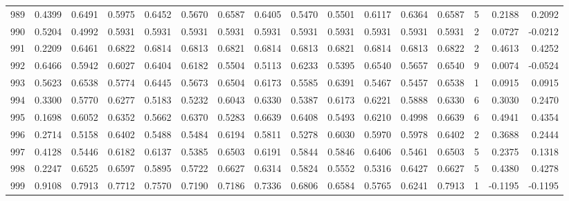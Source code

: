 \begin{tabular}{lrrrrrrrrrrrrrrr}
989 &      0.4399 &  0.6491 &  0.5975 &  0.6452 &  0.5670 &  0.6587 &  0.6405 &  0.5470 &  0.5501 &  0.6117 &   0.6364 &     0.6587 &      5 &                    0.2188 &                     0.2092 \\
990 &      0.5204 &  0.4992 &  0.5931 &  0.5931 &  0.5931 &  0.5931 &  0.5931 &  0.5931 &  0.5931 &  0.5931 &   0.5931 &     0.5931 &      2 &                    0.0727 &                    -0.0212 \\
991 &      0.2209 &  0.6461 &  0.6822 &  0.6814 &  0.6813 &  0.6821 &  0.6814 &  0.6813 &  0.6821 &  0.6814 &   0.6813 &     0.6822 &      2 &                    0.4613 &                     0.4252 \\
992 &      0.6466 &  0.5942 &  0.6027 &  0.6404 &  0.6182 &  0.5504 &  0.5113 &  0.6233 &  0.5395 &  0.6540 &   0.5657 &     0.6540 &      9 &                    0.0074 &                    -0.0524 \\
993 &      0.5623 &  0.6538 &  0.5774 &  0.6445 &  0.5673 &  0.6504 &  0.6173 &  0.5585 &  0.6391 &  0.5467 &   0.5457 &     0.6538 &      1 &                    0.0915 &                     0.0915 \\
994 &      0.3300 &  0.5770 &  0.6277 &  0.5183 &  0.5232 &  0.6043 &  0.6330 &  0.5387 &  0.6173 &  0.6221 &   0.5888 &     0.6330 &      6 &                    0.3030 &                     0.2470 \\
995 &      0.1698 &  0.6052 &  0.6352 &  0.5662 &  0.6370 &  0.5283 &  0.6639 &  0.6408 &  0.5493 &  0.6210 &   0.4998 &     0.6639 &      6 &                    0.4941 &                     0.4354 \\
996 &      0.2714 &  0.5158 &  0.6402 &  0.5488 &  0.5484 &  0.6194 &  0.5811 &  0.5278 &  0.6030 &  0.5970 &   0.5978 &     0.6402 &      2 &                    0.3688 &                     0.2444 \\
997 &      0.4128 &  0.5446 &  0.6182 &  0.6137 &  0.5385 &  0.6503 &  0.6191 &  0.5844 &  0.5846 &  0.6406 &   0.5461 &     0.6503 &      5 &                    0.2375 &                     0.1318 \\
998 &      0.2247 &  0.6525 &  0.6597 &  0.5895 &  0.5722 &  0.6627 &  0.6314 &  0.5824 &  0.5552 &  0.5316 &   0.6427 &     0.6627 &      5 &                    0.4380 &                     0.4278 \\
999 &      0.9108 &  0.7913 &  0.7712 &  0.7570 &  0.7190 &  0.7186 &  0.7336 &  0.6806 &  0.6584 &  0.5765 &   0.6241 &     0.7913 &      1 &                   -0.1195 &                    -0.1195 \\
\bottomrule
\end{tabular}
